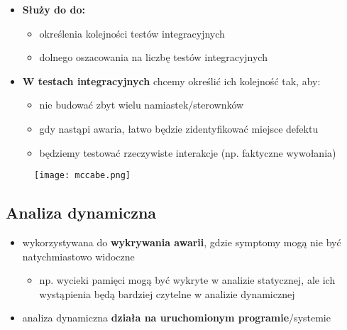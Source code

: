 \documentclass[../main.tex]{subfiles}
\begin{document}
\begin{itemize}
\begin{itemize}
            \item \textbf{Służy do do:}
            \begin{itemize}
                \item określenia kolejności testów integracyjnych
                \item dolnego oszacowania na liczbę testów integracyjnych
            \end{itemize}

            \item \textbf{W testach integracyjnych} chcemy określić ich kolejność tak, aby:
            \begin{itemize}
                \item nie budować zbyt wielu namiastek/sterownków
                \item gdy nastąpi awaria, łatwo będzie zidentyfikować miejsce defektu
                \item będziemy testować rzeczywiste interakcje (np. faktyczne wywołania)
            \end{itemize}
        \end{itemize}
    \end{itemize}
    \begin{figure}[H]
        \texttt{[image: mccabe.png]}
    \end{figure}

    \subsection{Analiza dynamiczna}
    \begin{itemize}
        \item wykorzystywana do \textbf{wykrywania awarii}, gdzie symptomy mogą nie być natychmiastowo widoczne
        \begin{itemize}
            \item np. wycieki pamięci mogą być wykryte w analizie statycznej, ale
            ich wystąpienia będą bardziej czytelne w analizie dynamicznej
        \end{itemize}
        \item analiza dynamiczna \textbf{działa na uruchomionym programie}/systemie
    \end{itemize}
\end{document}
